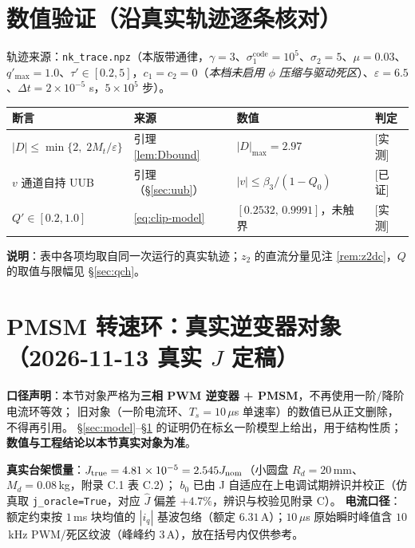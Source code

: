 \documentclass[11pt,a4paper]{article}
\theoremstyle{remark}\newtheorem{remark}{注}
\newcommand{\pv}[1]{\textsf{[#1]}}
\begin{document}
\section{数值验证（沿真实轨迹逐条核对）}\label{sec:verify}
轨迹来源：\texttt{nk\_trace.npz}（本版带通律，$\gamma=3$、$\sigma_1^{\mathrm{code}}=10^{5}$、$\sigma_2=5$、$\mu=0.03$、$q'_{\max}=1.0$、$\tau'\in[0.2,5]$，$c_1=c_2=0$（\emph{本档未启用 $\phi$ 压缩与驱动死区}）、$\varepsilon=6.5$、$\Delta t=2\times10^{-5}$ s，$5\times10^{5}$ 步）。
\begin{center}
\footnotesize
\begin{tabular}{@{}llll@{}}
\toprule
断言 & 来源 & 数值 & 判定\\
\midrule
$|D|\le\min\{2,\;2M_t/\varepsilon\}$ & 引理 \ref{lem:Dbound} & $|D|_{\max}=2.97$ & \pv{实测}\\
$v$ 通道自持 UUB & 引理（§\ref{sec:uub}） & $|v|\le\beta_3/(1-Q_0)$ & \pv{已证}\\
$Q'\in[0.2,1.0]$ & \eqref{eq:clip-model} & $[0.2532,\,0.9991]$，未触界 & \pv{实测}\\
\bottomrule
\end{tabular}
\end{center}
\textbf{说明}：表中各项均取自同一次运行的真实轨迹；$z_2$ 的直流分量见注 \ref{rem:z2dc}，$Q$ 的取值与限幅见 \S\ref{sec:qch}。

\section{PMSM 转速环：真实逆变器对象（2026-11-13 真实 $J$ 定稿）}\label{sec:pmsm}
\textbf{口径声明}：本节对象严格为\textbf{三相 PWM 逆变器 + PMSM}，不再使用一阶/降阶电流环等效；
旧对象（一阶电流环、$T_s=10\,\mu$s 单速率）的数值已从正文删除，不得再引用。
\S\ref{sec:model}--\S\ref{sec:verify} 的证明仍在标幺一阶模型上给出，用于结构性质；
\textbf{数值与工程结论以本节真实对象为准}。

\textbf{真实台架惯量}：$J_{\rm true}=4.81\times10^{-5}=2.545J_{\rm nom}$（小圆盘 $R_d=20$\,mm、$M_d=0.08$\,kg，附录 C.1 表 C.2）；
$b_0$ 已由 J 自适应在上电调试期辨识并校正（仿真取 \texttt{j\_oracle=True}，对应 $\hat J$ 偏差 $+4.7\%$，辨识与校验见附录 C）。
\textbf{电流口径}：额定约束按 $1$\,ms 块均值的 $|i_q|$ 基波包络（额定 $6.31$\,A）；$10$\,$\mu$s 原始瞬时峰值含 $10$\,kHz PWM/死区纹波（峰峰约 $3$\,A），放在括号内仅供参考。
\end{document}
